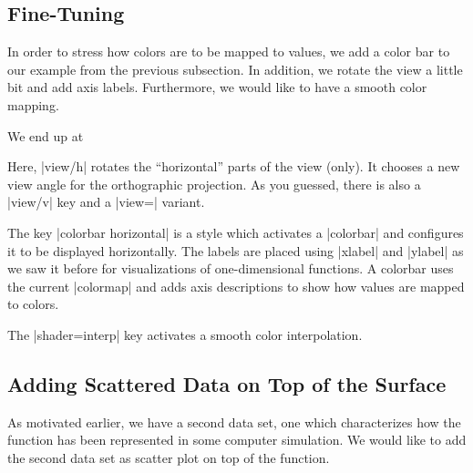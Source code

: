 \subsection{Fine-Tuning}

In order to stress how colors are to be mapped to values, we add a color bar to
our example from the previous subsection. In addition, we rotate the view a
little bit and add axis labels. Furthermore, we would like to have a smooth
color mapping.

We end up at
%
\pgfplotsexpensiveexample
\begin{codeexample}[]
\end{codeexample}
%
Here, |view/h| rotates the ``horizontal'' parts of the view (only). It chooses
a new view angle for the orthographic projection. As you guessed, there is also
a |view/v| key and a |view=| variant.

The key |colorbar horizontal| is a style which activates a |colorbar| and
configures it to be displayed horizontally. The labels are placed using
|xlabel| and |ylabel| as we saw it before for visualizations of one-dimensional
functions. A colorbar uses the current |colormap| and adds axis descriptions to
show how values are mapped to colors.

 The |shader=interp| key activates a smooth color interpolation.


\subsection{Adding Scattered Data on Top of the Surface}

As motivated earlier, we have a second data set, one which characterizes how
the function has been represented in some computer simulation. We would like to
add the second data set as scatter plot on top of the function.

